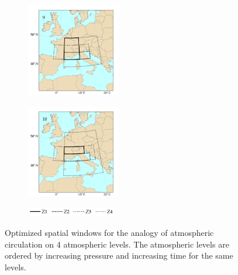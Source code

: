 \documentclass[twocol]{ametsoc}
\begin{document}
\begin{figure}[htb]
\begin{subfigure}{.5\columnwidth}
	\end{subfigure}
	\begin{subfigure}{.5\columnwidth}
		\centering
		\includegraphics[width=4.1cm]{figures/spatial_win_z4/Spatial_windows_9.png}
	\end{subfigure}%
	\begin{subfigure}{.5\columnwidth}
		\centering
		\includegraphics[width=4.1cm]{figures/spatial_win_z4/Spatial_windows_10.png}
	\end{subfigure}
	\begin{subfigure}{.5\columnwidth}
		\centering
		\includegraphics[width=3.9cm]{figures/spatial_win_z4/legend.png}
	\end{subfigure}
	\caption{Optimized spatial windows for the analogy of atmospheric circulation on 4 atmospheric levels. The atmospheric levels are ordered by increasing pressure and increasing time for the same levels.}
	\label{fig:spatial_windows_z4}
\end{figure}
\end{document}
